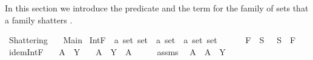%
\begin{isabellebody}%
%
%
\isadelimdocument
%
\endisadelimdocument
%
\isatagdocument
%
\isamarkuptrue%
%
\endisatagdocument
{\isafolddocument}%
%
\isadelimdocument
%
\endisadelimdocument
%
\begin{isamarkuptext}%
In this section we introduce the predicate  and the term for the family of sets that a family shatters .%
\end{isamarkuptext}\isamarkuptrue%
%
\isadelimtheory
%
\endisadelimtheory
%
\isatagtheory
{}\isamarkupfalse%
\ Shattering\isanewline
\ \ \ Main\isanewline
{}%
\endisatagtheory
{\isafoldtheory}%
%
\isadelimtheory
%
\endisadelimtheory
%
\isadelimdocument
%
\endisadelimdocument
%
\isatagdocument
%
\isamarkuptrue%
%
\endisatagdocument
{\isafolddocument}%
%
\isadelimdocument
%
\endisadelimdocument
{}\isamarkupfalse%
\ IntF\ {\isacharcolon}{\kern0pt}{\isacharcolon}{\kern0pt}\ {\isachardoublequoteopen}{\isacharprime}{\kern0pt}a\ set\ set\ {\isasymRightarrow}\ {\isacharprime}{\kern0pt}a\ set\ {\isasymRightarrow}\ {\isacharprime}{\kern0pt}a\ set\ set{\isachardoublequoteclose}\ {\isacharparenleft}{\kern0pt}\ {\isachardoublequoteopen}{\isasyminter}{\isacharasterisk}{\kern0pt}{\isachardoublequoteclose}\ {}{}{\isacharparenright}{\kern0pt}\isanewline
\ \ \ {\isachardoublequoteopen}F\ {\isasyminter}{\isacharasterisk}{\kern0pt}\ S\ {\isasymequiv}\ {\isacharparenleft}{\kern0pt}{\isacharparenleft}{\kern0pt}{\isasyminter}{\isacharparenright}{\kern0pt}\ S{\isacharparenright}{\kern0pt}\ {\isacharbackquote}{\kern0pt}\ F{\isachardoublequoteclose}\isanewline
\isanewline
{}\isamarkupfalse%
\ idem{\isacharunderscore}{\kern0pt}IntF{\isacharcolon}{\kern0pt}\isanewline
\ \ \ {\isachardoublequoteopen}{\isasymUnion}A\ {\isasymsubseteq}\ Y{\isachardoublequoteclose}\isanewline
\ \ \ {\isachardoublequoteopen}A\ {\isasyminter}{\isacharasterisk}{\kern0pt}\ Y\ {\isacharequal}{\kern0pt}\ A{\isachardoublequoteclose}\isanewline
%
\isadelimproof
%
\endisadelimproof
%
\isatagproof
{}\isamarkupfalse%
\ {\isacharminus}{\kern0pt}\isanewline
\ \ \isamarkupfalse%
\ assms\ \isamarkupfalse%
\ {\isachardoublequoteopen}A\ {\isasymsubseteq}\ A\ {\isasyminter}{\isacharasterisk}{\kern0pt}\ Y{\isachardoublequoteclose}\ \isamarkupfalse%

\end{isabellebody}
